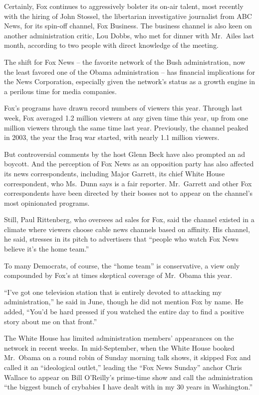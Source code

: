 ﻿\documentclass[12pt]{article}
\begin{document}
Certainly, Fox continues to aggressively bolster its on-air talent, most recently with the hiring of
John Stossel, the libertarian investigative journalist from ABC News, for its spin-off channel, Fox
Business. The business channel is also keen on another administration critic, Lou Dobbs, who met for
dinner with Mr.~Ailes last month, according to two people with direct knowledge of the meeting.

The shift for Fox News -- the favorite network of the Bush administration, now the least favored one
of the Obama administration -- has financial implications for the News Corporation, especially given
the network's status as a growth engine in a perilous time for media companies.

Fox's programs have drawn record numbers of viewers this year. Through last week, Fox averaged 1.2
million viewers at any given time this year, up from one million viewers through the same time last
year. Previously, the channel peaked in 2003, the year the Iraq war started, with nearly 1.1 million
viewers.

But controversial comments by the host Glenn Beck have also prompted an ad boycott. And the
perception of Fox News as an opposition party has also affected its news correspondents, including
Major Garrett, its chief White House correspondent, who Ms.~Dunn says is a fair reporter.
Mr.~Garrett and other Fox correspondents have been directed by their bosses not to appear on the
channel's most opinionated programs.

Still, Paul Rittenberg, who oversees ad sales for Fox, said the channel existed in a climate where
viewers choose cable news channels based on affinity. His channel, he said, stresses in its pitch to
advertisers that ``people who watch Fox News believe it's the home team.''

To many Democrats, of course, the ``home team'' is conservative, a view only compounded by Fox's at
times skeptical coverage of Mr.~Obama this year.

``I've got one television station that is entirely devoted to attacking my administration,'' he said
in June, though he did not mention Fox by name. He added, ``You'd be hard pressed if you watched the
entire day to find a positive story about me on that front.''

The White House has limited administration members' appearances on the network in recent weeks. In
mid-September, when the White House booked Mr.~Obama on a round robin of Sunday morning talk shows,
it skipped Fox and called it an ``ideological outlet,'' leading the ``Fox News Sunday'' anchor Chris
Wallace to appear on Bill O'Reilly's prime-time show and call the administration ``the biggest bunch
of crybabies I have dealt with in my 30 years in Washington.''
\end{document}
